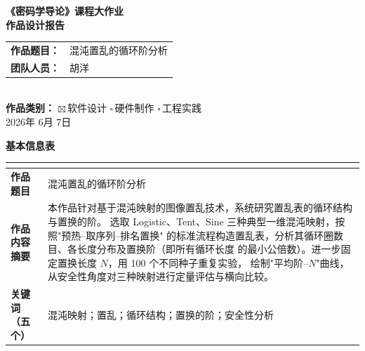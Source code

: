 \documentclass[12pt, a4paper]{article}
\begin{document}
\thispagestyle{empty}
\begin{center}
  \vspace*{1.5cm}
  {\fontsize{18pt}{22pt}\selectfont\bfseries
   《密码学导论》课程大作业\\[0.5em]
   作品设计报告}\\[2.2cm]

  \begin{tabular}{ll}
    {\large\textbf{作品题目：}} &
      {\large 混沌置乱的循环阶分析} \\[1.2em]
    {\large\textbf{团队人员：}} &
      {\large 胡洋} \\
  \end{tabular}\\[4.5cm]

  {\large\textbf{作品类别：}\quad
    $\boxtimes$\,软件设计\quad
    $\square$\,硬件制作\quad
    $\square$\,工程实践}\\[3.5cm]

  {\large 2026年 6月 7日}
\end{center}
\newpage

\thispagestyle{empty}
\begin{center}
  {\large\bfseries 基本信息表}
\end{center}
\vspace{0.5em}

\renewcommand{\arraystretch}{1.6}
\begin{tabular}{|>{\bfseries}p{3.2cm}|p{10.1cm}|}
  \hline
  \rowcolor{headblue!12}
  \multicolumn{2}{|c|}{\bfseries 基本信息} \\
  \hline
  作品题目 & 混沌置乱的循环阶分析 \\
  \hline
  作品内容摘要 &
    本作品针对基于混沌映射的图像置乱技术，系统研究置乱表的循环结构与置换的阶。
    选取 Logistic、Tent、Sine 三种典型一维混沌映射，按照"预热–取序列–排名置换"
    的标准流程构造置乱表，分析其循环圈数目、各长度分布及置换阶（即所有循环长度
    的最小公倍数）。进一步固定置换长度 $N$，用 100 个不同种子重复实验，
    绘制"平均阶–$N$"曲线，从安全性角度对三种映射进行定量评估与横向比较。\\
  \hline
  关键词（五个）& 混沌映射；置乱；循环结构；置换的阶；安全性分析 \\
  \hline
\end{tabular}

\vspace{1.0em}
\end{document}
